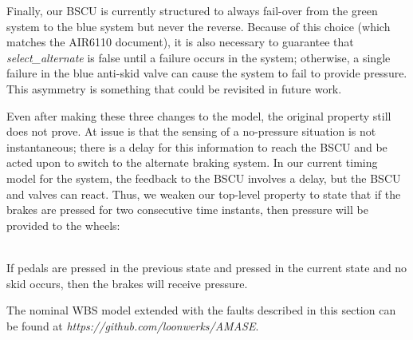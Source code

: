Finally, our BSCU is currently structured to always fail-over from the green system to the blue system but never the reverse.  Because of this choice (which matches the AIR6110 document), it is also necessary to guarantee that \textit{select\_alternate} is false until a failure occurs in the system; otherwise, a single failure in the blue anti-skid valve can cause the system to fail to provide pressure.  This asymmetry is something that could be revisited in future work.


Even after making these three changes to the model, the original property still does not prove.  At issue is that the sensing of a no-pressure situation is not instantaneous; there is a delay for this information to reach the BSCU and be acted upon to switch to the alternate braking system.  In our current timing model for the system, the feedback to the BSCU involves a delay, but the BSCU and valves can react.  Thus, we weaken our top-level property to state that if the brakes are pressed for two consecutive time instants, then pressure will be provided to the wheels:

\begin{tt}
\ \\
If pedals are pressed in the previous state and pressed in the current state and no skid occurs, then the brakes will receive pressure. \\
\end{tt}

The nominal WBS model extended with the faults described in this section can be found at \textit{https://github.com/loonwerks/AMASE}. 
















